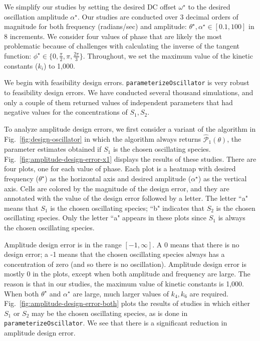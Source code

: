 \documentclass{bmcart}
\newcommand{\fig}[1]{Fig.~\ref{#1}}
\begin{document}
We simplify our studies by setting the desired DC offset $\omega^{\star}$ to the desired oscillation
amplitude $\alpha^{\star}$. Our studies are conducted over 3 decimal orders of magnitude for both frequency (radians/sec) and amplitude: $\theta^{\star}, \alpha^{\star} \in [0.1, 100]$ in 8 increments. We consider four values of phase that are likely the most problematic because of challenges with calculating the inverse of the tangent function: $\phi^{\star} \in \{0, \frac{\pi}{2}, \pi, \frac{2 \pi}{3} \}.$ Throughout, we set the maximum value of the kinetic constants ($k_i$) to 1,000.

We begin with feasibility design errors. {\tt parameterizeOscillator} is very robust to feasibility design errors. We have conducted several thousand simulations, and only a couple of them returned values of independent parameters that had negative values for the concentrations of $S_1, S_2$.

To analyze amplitude design errors, we first consider a variant of the algorithm in \fig{fig:design-oscillator} in which the algorithm always returns $\hat{\mathcal{P}}_1 (\theta)$, the parameter estimates obtained if $S_1$ is the chosen oscillating species. \fig{fig:amplitude-design-error-x1} displays the results of these studies. There are four plots, one for each value of phase. Each plot is a heatmap with desired frequency ($\theta^{\star}$) as the horizontal axis and desired amplitude ($\alpha^{\star}$) as the vertical axis. Cells are colored by the magnitude of the design error, and they are annotated with the value of the design error followed by a letter. The letter ``a" means that $S_1$ is the chosen oscillating species; ``b" indicates that $S_2$ is the chosen oscillating species. Only the letter ``a" appears in these plots since $S_1$ is always the chosen oscillating species.

Amplitude design error is in the range $[-1, \infty]$. A 0 means that there is no design error; a -1 means that the chosen oscillating species always has a concentration of zero (and so there is no oscillation). Amplitude design error is mostly 0 in the plots, except when both amplitude and frequency are large. The reason is that in our studies, the maximum value of kinetic constants is 1,000. When both $\theta^{\star}$ and $\alpha^{\star}$ are large, much larger values of $k_4, k_6$ are required. \fig{fig:amplitude-design-error-both} plots the results of studies in which either $S_1$ or $S_2$ may be the chosen oscillating species, as is done in {\tt parameterizeOscillator}. We see that there is a significant reduction in amplitude design error.
\end{document}
